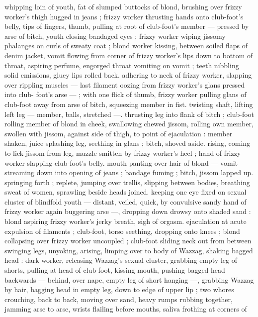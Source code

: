 whipping loin of youth, fat of slumped buttocks of blond, brushing 
over frizzy worker's thigh hugged in jeans ; frizzy worker thrusting 
hands onto club-foot's belly, tips of fingers, thumb, pulling at root of 
club-foot's member --- pressed by arse of bitch, youth closing 
bandaged eyes ; frizzy worker wiping jissomy phalanges on curls of 
sweaty coat ; blond worker kissing, between soiled flaps of denim 
jacket, vomit flowing from corner of frizzy worker's lips down to 
bottom of throat, aspiring perfume, engorged throat vomiting on 
vomit ; teeth nibbling solid emissions, gluey lips rolled back. 
adhering to neck of frizzy worker, slapping over rippling muscles --- 
last filament oozing from frizzy worker's glans pressed into club- 
foot's arse --- ; with one flick of thumb, frizzy worker pulling glans 
of club-foot away from arse of bitch, squeezing member in fist. 
twisting shaft, lifting left leg --- member, balls, stretched ---. 
thrusting leg into flank of bitch ; club-foot rolling member of blond 
in cheek, swallowing chewed jissom, rolling own member, swollen 
with jissom, against side of thigh, to point of ejaculation : member 
shaken, juice splashing leg, seething in glans ; bitch, shoved aside. 
rising, coming to lick jissom from leg, muzzle smitten by frizzy 
worker's heel ; hand of frizzy worker slapping club-foot's belly. 
mouth panting over hair of blond --- vomit streaming down into 
opening of jeans ; bandage fuming ; bitch, jissom lapped up. 
springing forth ; replete, jumping over trellis, slipping between 
bodies, breathing sweat of women, sprawling beside heads joined. 
keeping one eye fixed on sexual cluster of blindfold youth --- 
distant, veiled, quick, by convulsive sandy hand of frizzy worker 
again buggering arse ---, dropping down drowsy onto shaded sand : 
blond aspiring frizzy worker's jerky breath, sigh of orgasm. 
ejaculation at acute expulsion of filaments ; club-foot, torso 
seething, dropping onto knees ; blond collapsing over frizzy worker 
uncoupled ; club-foot sliding neck out from between swinging legs, 
unyoking, arising, limping over to body of Wazzag, shaking bagged 
head : dark worker, releasing Wazzag's sexual cluster, grabbing 
empty leg of shorts, pulling at head of club-foot, kissing mouth, 
pushing bagged head backwards --- behind, over nape, empty leg of 
short hanging ---, grabbing Wazzag by hair, bagging head in empty 
leg, down to edge of upper lip ; two whores crouching, back to back, 
moving over sand, heavy rumps rubbing together, jamming arse to 
arse, wrists flailing before mouths, saliva frothing at corners of 
